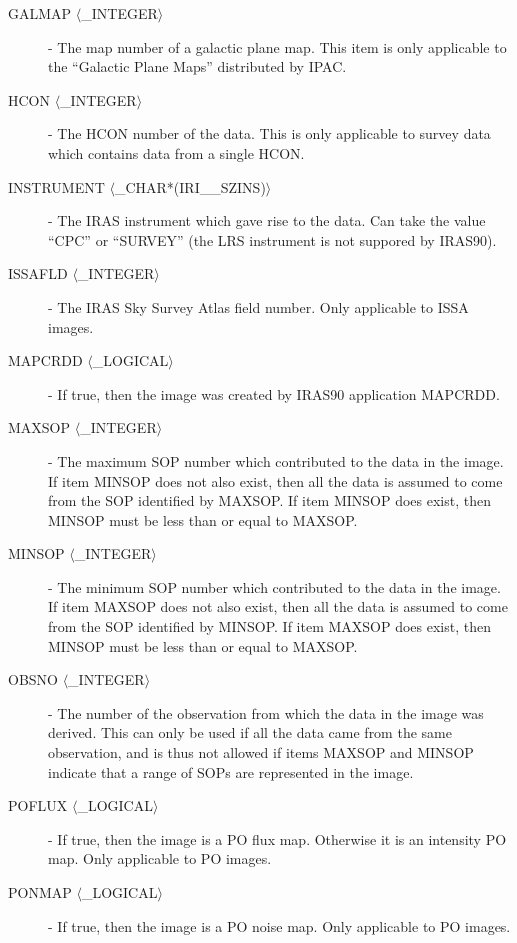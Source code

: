 \begin{description}
\item [GALMAP $\langle$\_INTEGER$\rangle$] - The map number of a galactic plane map. This item
is only applicable to the ``Galactic Plane Maps'' distributed by IPAC.

\item [HCON $\langle$\_INTEGER$\rangle$] - The HCON number of the data. This is only applicable
to survey data which contains data from a single HCON.

\item [INSTRUMENT $\langle$\_CHAR*(IRI\_\_SZINS)$\rangle$] - The IRAS instrument
which gave rise to the data. Can take the value ``CPC'' or ``SURVEY'' (the LRS
instrument is not suppored by IRAS90).

\item [ISSAFLD $\langle$\_INTEGER$\rangle$] - The IRAS Sky Survey Atlas
field number. Only applicable to ISSA images.

\item [MAPCRDD $\langle$\_LOGICAL$\rangle$] - If true, then the image was
created by IRAS90 application MAPCRDD.

\item [MAXSOP $\langle$\_INTEGER$\rangle$] - The maximum SOP number which contributed to the
data in the image. If item MINSOP does not also exist, then all the data is
assumed to come from the SOP identified by MAXSOP. If item MINSOP does exist,
then MINSOP must be less than or equal to MAXSOP.

\item [MINSOP $\langle$\_INTEGER$\rangle$] - The minimum SOP number which contributed to the
data in the image. If item MAXSOP does not also exist, then all the data is
assumed to come from the SOP identified by MINSOP. If item MAXSOP does exist,
then MINSOP must be less than or equal to MAXSOP.

\item [OBSNO $\langle$\_INTEGER$\rangle$] - The number of the observation from which the data in
the image was derived. This can only be used if all the data came from the same
observation, and is thus not allowed if items MAXSOP and MINSOP indicate that a
range of SOPs are represented in the image.

\item [POFLUX $\langle$\_LOGICAL$\rangle$] - If true, then the image is a PO
flux map. Otherwise it is an intensity PO map. Only applicable to PO
images.

\item [PONMAP $\langle$\_LOGICAL$\rangle$] - If true, then the image is a PO
noise map. Only applicable to PO images.


\end{description}
